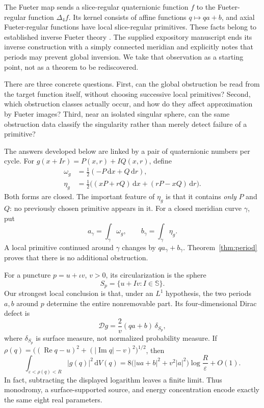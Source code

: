 \documentclass[11pt,a4paper]{article}
\numberwithin{equation}{section}
\theoremstyle{definition}
\theoremstyle{remark}
\newcommand{\SSS}{\mathbb S}
\newcommand{\ic}{\iota}
\newcommand{\D}{\mathcal D}
\newcommand{\lap}{\Delta_4}
\newcommand{\Rea}{\operatorname{Re}}
\newcommand{\Ima}{\operatorname{Im}}
\newcommand{\dd}{\,\mathrm d}
\begin{document}
The Fueter map sends a slice-regular quaternionic function $f$ to the
Fueter-regular function $\lap f$. Its kernel consists of affine functions
$q\mapsto qa+b$, and axial Fueter-regular functions have local slice-regular
primitives. These facts belong to established inverse Fueter theory
\cite{CSS,CPSS}. The supplied expository manuscript \cite{Supplied} ends its
inverse construction with a simply connected meridian and explicitly notes
that periods may prevent global inversion. We take that observation as a
starting point, not as a theorem to be rediscovered.

There are three concrete questions. First, can the global obstruction be read
from the target function itself, without choosing successive local primitives?
Second, which obstruction classes actually occur, and how do they affect
approximation by Fueter images? Third, near an isolated singular sphere, can
the same obstruction data classify the singularity rather than merely detect
failure of a primitive?

The answers developed below are linked by a pair of quaternionic numbers per
cycle. For $g(x+Ir)=P(x,r)+I Q(x,r)$, define
\begin{align}
 \omega_g&=\frac12(-P\dd x+Q\dd r),\label{eq:intro-omega}\\
 \eta_g&=\frac12\bigl((xP+rQ)\dd x+(rP-xQ)\dd r\bigr).
 \label{eq:intro-eta}
\end{align}
Both forms are closed. The important feature of $\eta_g$ is that it contains
\emph{only} $P$ and $Q$: no previously chosen primitive appears in it.
For a closed meridian curve $\gamma$, put
\[
 a_\gamma=\int_\gamma\omega_g,\qquad
 b_\gamma=\int_\gamma\eta_g.
\]
A local primitive continued around $\gamma$ changes by $qa_\gamma+b_\gamma$.
Theorem~\ref{thm:period} proves that there is no additional obstruction.

For a puncture $p=u+\ic v$, $v>0$, its circularization is the sphere
\[
 S_p=\{u+Iv:I\in\SSS\}.
\]
Our strongest local conclusion is that, under an $L^1$ hypothesis, the two
periods $a,b$ around $p$ determine the entire nonremovable part. Its
four-dimensional Dirac defect is
\begin{equation}
 \D g=\frac{2}{v}(qa+b)\,\delta_{S_p},
 \label{eq:intro-defect}
\end{equation}
where $\delta_{S_p}$ is surface measure, not normalized probability measure.
If $\rho(q)=\bigl((\Rea q-u)^2+(|\Ima q|-v)^2\bigr)^{1/2}$, then
\begin{equation}
 \int_{\varepsilon<\rho(q)<R}|g(q)|^2\dd V(q)
 =8\bigl(|ua+b|^2+v^2|a|^2\bigr)\log\frac R\varepsilon+O(1).
 \label{eq:intro-energy}
\end{equation}
In fact, subtracting the displayed logarithm leaves a finite limit.
Thus monodromy, a surface-supported source, and energy concentration encode
exactly the same eight real parameters.
\end{document}
